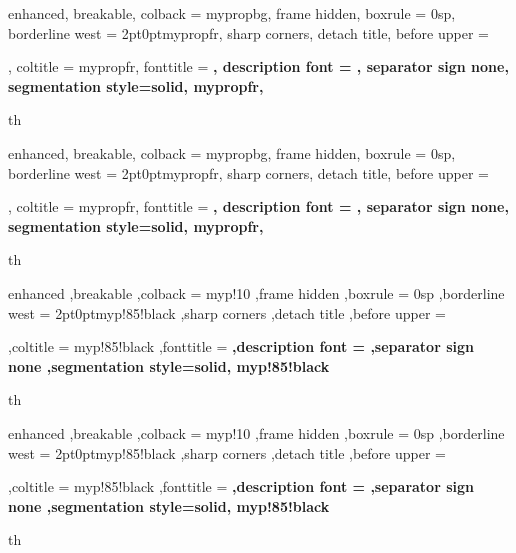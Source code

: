 {%
	enhanced,
	breakable,
	colback = mypropbg,
	frame hidden,
	boxrule = 0sp,
	borderline west = {2pt}{0pt}{mypropfr},
	sharp corners,
	detach title,
	before upper = \tcbtitle\par\smallskip,
	coltitle = mypropfr,
	fonttitle = \bfseries\sffamily,
	description font = \mdseries,
	separator sign none,
	segmentation style={solid, mypropfr},
}
{th}


{%
	enhanced,
	breakable,
	colback = mypropbg,
	frame hidden,
	boxrule = 0sp,
	borderline west = {2pt}{0pt}{mypropfr},
	sharp corners,
	detach title,
	before upper = \tcbtitle\par\smallskip,
	coltitle = mypropfr,
	fonttitle = \bfseries\sffamily,
	description font = \mdseries,
	separator sign none,
	segmentation style={solid, mypropfr},
}
{th}


{%
	enhanced
	,breakable
	,colback = myp!10
	,frame hidden
	,boxrule = 0sp
	,borderline west = {2pt}{0pt}{myp!85!black}
	,sharp corners
	,detach title
	,before upper = \tcbtitle\par\smallskip
	,coltitle = myp!85!black
	,fonttitle = \bfseries\sffamily
	,description font = \mdseries
	,separator sign none
	,segmentation style={solid, myp!85!black}
}
{th}
{%
	enhanced
	,breakable
	,colback = myp!10
	,frame hidden
	,boxrule = 0sp
	,borderline west = {2pt}{0pt}{myp!85!black}
	,sharp corners
	,detach title
	,before upper = \tcbtitle\par\smallskip
	,coltitle = myp!85!black
	,fonttitle = \bfseries\sffamily
	,description font = \mdseries
	,separator sign none
	,segmentation style={solid, myp!85!black}
}
{th}


